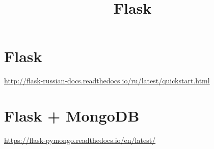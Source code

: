 
\newif\ifFULL
\FULLtrue


\footskip=30pt
\date{}
\title{Flask}
\maketitle
\pagestyle{plain}
\setcounter{secnumdepth}{2}  %



\section{Flask}

\url{http://flask-russian-docs.readthedocs.io/ru/latest/quickstart.html}





\section{Flask + MongoDB}

\url{https://flask-pymongo.readthedocs.io/en/latest/}

 


